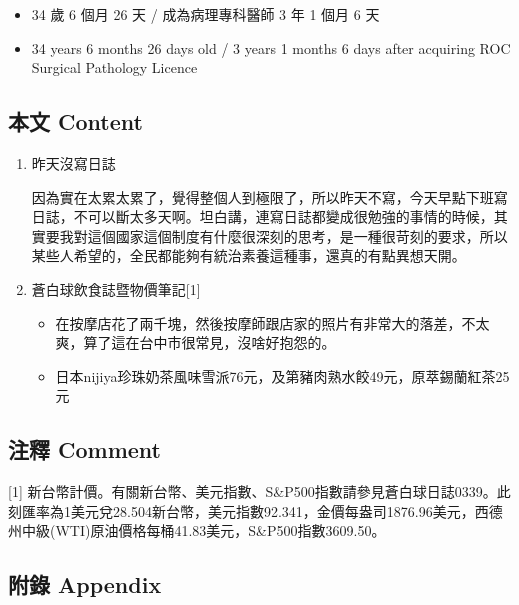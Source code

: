 \documentclass[a5paper, 11pt
]{book}
\providecommand{\tightlist}{%
  \setlength{\itemsep}{0pt}\setlength{\parskip}{0pt}}
\begin{document}
\begin{itemize}
\tightlist
\item
  34 歲 6 個月 26 天 / 成為病理專科醫師 3 年 1 個月 6 天
\item
  34 years 6 months 26 days old / 3 years 1 months 6 days after
  acquiring ROC Surgical Pathology Licence
\end{itemize}

\hypertarget{ux672cux6587-content-71}{%
\subsection{本文 Content}\label{ux672cux6587-content-71}}

\begin{enumerate}
\def\labelenumi{\arabic{enumi}.}
\item
  昨天沒寫日誌

  因為實在太累太累了，覺得整個人到極限了，所以昨天不寫，今天早點下班寫日誌，不可以斷太多天啊。坦白講，連寫日誌都變成很勉強的事情的時候，其實要我對這個國家這個制度有什麼很深刻的思考，是一種很苛刻的要求，所以某些人希望的，全民都能夠有統治素養這種事，還真的有點異想天開。
\item
  蒼白球飲食誌暨物價筆記{[}1{]}

  \begin{itemize}
  \tightlist
  \item
    在按摩店花了兩千塊，然後按摩師跟店家的照片有非常大的落差，不太爽，算了這在台中市很常見，沒啥好抱怨的。
  \item
    日本nijiya珍珠奶茶風味雪派76元，及第豬肉熟水餃49元，原萃錫蘭紅茶25元
  \end{itemize}
\end{enumerate}

\hypertarget{ux6ce8ux91cb-comment-71}{%
\subsection{注釋 Comment}\label{ux6ce8ux91cb-comment-71}}

{[}1{]}
新台幣計價。有關新台幣、美元指數、S\&P500指數請參見蒼白球日誌0339。此刻匯率為1美元兌28.504新台幣，美元指數92.341，金價每盎司1876.96美元，西德州中級(WTI)原油價格每桶41.83美元，S\&P500指數3609.50。

\hypertarget{ux9644ux9304-appendix-71}{%
\subsection{附錄 Appendix}\label{ux9644ux9304-appendix-71}}
\end{document}
